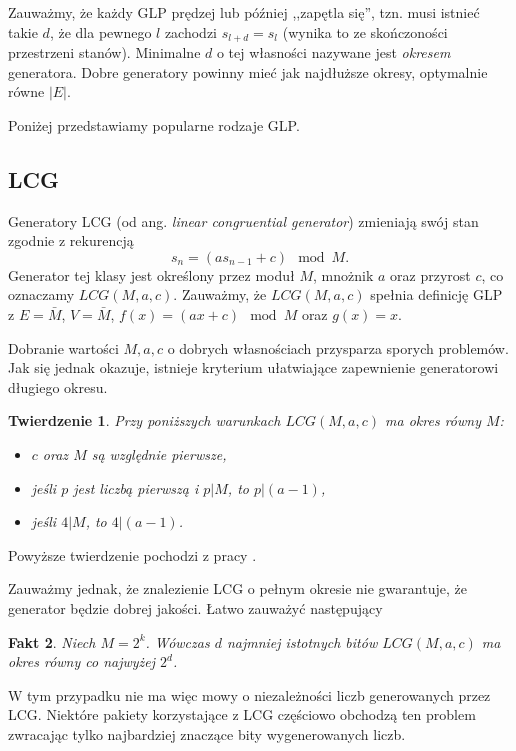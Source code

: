 \documentclass[a4paper,11pt,twoside]{book}
\newtheorem{twier}{Twierdzenie}[chapter]
\newtheorem{fakt}[twier]{Fakt}
\theoremstyle{definition}
\begin{document}
Zauważmy, że każdy GLP prędzej lub później ,,zapętla się'', tzn. musi istnieć takie $d$, że dla pewnego $l$ zachodzi $s_{l+d} = s_l$ (wynika to ze skończoności przestrzeni stanów). Minimalne $d$ o tej własności nazywane jest \textit{okresem} generatora. Dobre generatory powinny mieć jak najdłuższe okresy, optymalnie równe $|E|$.

Poniżej przedstawiamy popularne rodzaje GLP.

\subsection*{LCG}
Generatory LCG (od ang. \textit{linear congruential generator}) zmieniają swój stan zgodnie z rekurencją
\begin{equation}
 \label{eq:lcg}
 s_n = (a s_{n-1} + c) \mod M.
\end{equation}
Generator tej klasy jest określony przez moduł $M$, mnożnik $a$ oraz przyrost $c$, co oznaczamy $LCG(M,a,c)$. Zauważmy, że $LCG(M,a,c)$ spełnia definicję GLP z $E = \bar{M}$, $V = \bar{M}$, $f(x) = (a x + c) \mod M$ oraz $g(x) = x$.

Dobranie wartości $M, a, c$ o dobrych własnościach przysparza sporych problemów. Jak się jednak okazuje, istnieje kryterium ułatwiające zapewnienie generatorowi długiego okresu.
\begin{twier}
  Przy poniższych warunkach $LCG(M,a,c)$ ma okres równy $M$:
  \begin{itemize}
   \item $c$ oraz $M$ są względnie pierwsze,
   \item jeśli $p$ jest liczbą pierwszą i $p | M$, to $p |(a - 1)$,
   \item jeśli $4 | M$, to $4 |(a-1)$.
  \end{itemize}
\end{twier}
\noindent Powyższe twierdzenie pochodzi z pracy \cite{hull}.

Zauważmy jednak, że znalezienie LCG o pełnym okresie nie gwarantuje, że generator będzie dobrej jakości. Łatwo zauważyć następujący
\begin{fakt}
 \label{fakt:lcg_okres}
 Niech $M = 2^k$. Wówczas $d$ najmniej istotnych bitów $LCG(M,a,c)$ ma okres równy co najwyżej $2^d$.
\end{fakt}
\noindent W tym przypadku nie ma więc mowy o niezależności liczb generowanych przez LCG. Niektóre pakiety korzystające z LCG częściowo obchodzą ten problem zwracając tylko najbardziej znaczące bity wygenerowanych liczb.
\end{document}
